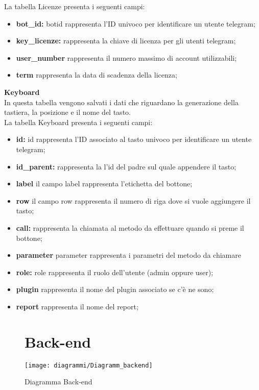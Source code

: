 La tabella Licenze presenta i seguenti campi:

\begin{itemize}
\item \textbf{bot\_id:}  botid rappresenta l'ID univoco per identificare un utente telegram;
\item \textbf{key\_licenze:} rappresenta la chiave di licenza per gli utenti telegram;
\item \textbf{user\_number } rappresenta il numero massimo di account utilizzabili;
\item \textbf{term} rappresenta la data di scadenza della licenza;
\end{itemize}




\textbf{Keyboard}\\

In questa tabella vengono salvati i dati che riguardano la generazione della tastiera, la posizione e il nome del tasto.\\

La tabella Keyboard presenta i seguenti campi:\\

\begin{itemize}
\item \textbf{id:} id rappresenta l'ID associato al tasto univoco per identificare un utente telegram;
\item \textbf{id\_parent:} rappresenta la l'id del padre sul quale appendere il tasto;
\item \textbf{label } il campo label rappresenta l'etichetta del bottone;
\item \textbf{row } il campo row rappresenta il numero di riga dove si vuole aggiungere il tasto;
\item \textbf{call:} rappresenta la chiamata al metodo da effettuare quando si preme il bottone;
\item \textbf{parameter } parameter rappresenta i  parametri del metodo da chiamare
\item \textbf{role:} role rappresenta il ruolo dell'utente (admin oppure user);
\item \textbf{plugin } rappresenta il nome del plugin associato se c'è ne sono;
\item \textbf{report} rappresenta il nome del report;
\end{itemize}

\clearpage


\begin{figure}
\section{Back-end}
\label{sec:backend}
 \begin{center}
     \texttt{[image: diagrammi/Diagramm\_backend]} 
    \caption{Diagramma Back-end }
    \end{center}

\end{figure}  




